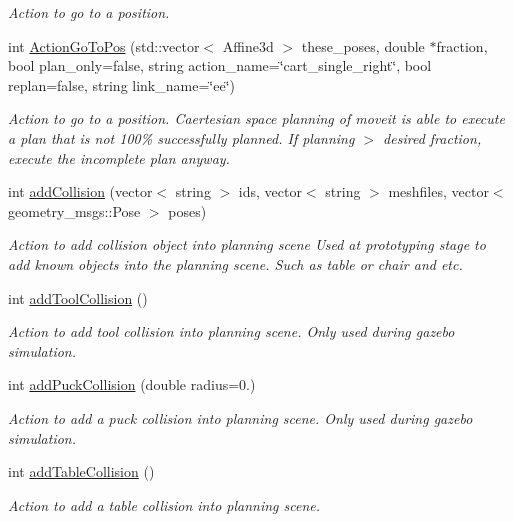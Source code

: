 \begin{DoxyCompactItemize}
\begin{DoxyCompactList}\small\item\em Action to go to a position. \end{DoxyCompactList}\item 
int \hyperlink{structManipulate_a65a8f830ad439fbc5236bd6d6be2f4d8}{Action\+Go\+To\+Pos} (std\+::vector$<$ Affine3d $>$ these\+\_\+poses, double $\ast$fraction, bool plan\+\_\+only=false, string action\+\_\+name=\char`\"{}cart\+\_\+single\+\_\+right\char`\"{}, bool replan=false, string link\+\_\+name=\char`\"{}ee\char`\"{})
\begin{DoxyCompactList}\small\item\em Action to go to a position. Caertesian space planning of moveit is able to execute a plan that is not 100\% successfully planned. If planning $>$ desired fraction, execute the incomplete plan anyway. \end{DoxyCompactList}\item 
int \hyperlink{structManipulate_a76fc2b66b3fbdacf43cb31cf5ae3c2e4}{add\+Collision} (vector$<$ string $>$ ids, vector$<$ string $>$ meshfiles, vector$<$ geometry\+\_\+msgs\+::\+Pose $>$ poses)
\begin{DoxyCompactList}\small\item\em Action to add collision object into planning scene Used at prototyping stage to add known objects into the planning scene. Such as table or chair and etc. \end{DoxyCompactList}\item 
int \hyperlink{structManipulate_a74221cc0607aabde800bb0a1f5c3e67d}{add\+Tool\+Collision} ()
\begin{DoxyCompactList}\small\item\em Action to add tool collision into planning scene. Only used during gazebo simulation. \end{DoxyCompactList}\item 
int \hyperlink{structManipulate_adeeb6f85db89cf573e22bcb73c806c70}{add\+Puck\+Collision} (double radius=0.)
\begin{DoxyCompactList}\small\item\em Action to add a puck collision into planning scene. Only used during gazebo simulation. \end{DoxyCompactList}\item 
int \hyperlink{structManipulate_a1f4484286205d02906a0f8d0d1d50ba5}{add\+Table\+Collision} ()
\begin{DoxyCompactList}\small\item\em Action to add a table collision into planning scene. \end{DoxyCompactList}\item 

\end{DoxyCompactItemize}
